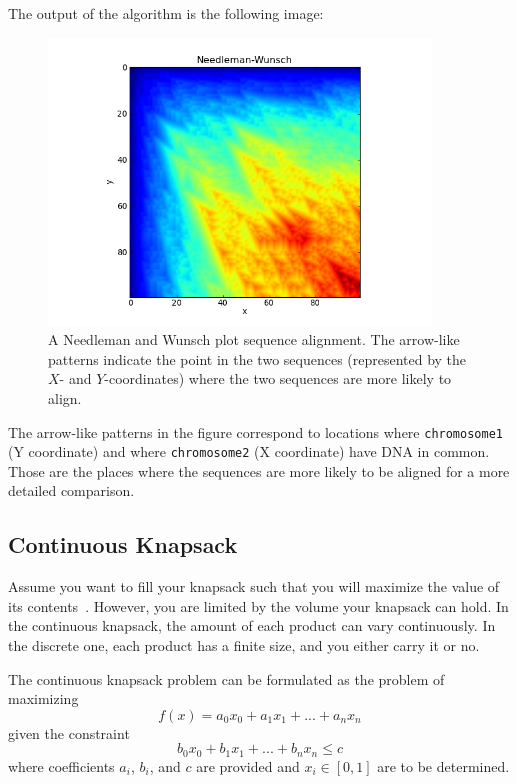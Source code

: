 \documentclass[justified,sixbynine]{tufte-book}
\def\ft{\small\tt}
\theoremstyle{plain}%
\theoremstyle{definition}
\theoremstyle{remark}
\begin{document}
\begin{fullwidth}
The output of the algorithm is the following image:

\begin{figure}[ht]
\centering\includegraphics[width=4in]{images/needleman.png}
\caption{A Needleman and Wunsch plot sequence alignment. The arrow-like patterns indicate the point in the two sequences (represented by the $X$- and $Y$-coordinates) where the two sequences are more likely to align.}
\end{figure}

The arrow-like patterns in the figure correspond to locations where {\ft chromosome1} (Y coordinate) and where {\ft chromosome2} (X coordinate) have DNA in common. Those are the places where the sequences are more likely to be aligned for a more detailed comparison.

\subsection{Continuous Knapsack}

Assume you want to fill your knapsack such that you will maximize the value of its contents~\cite{knapsack}.  However, you are limited by the volume your knapsack can hold. In the continuous knapsack, the amount of each product can vary continuously. In the discrete one, each product has a finite size, and you either carry it or no.

The continuous knapsack problem can be formulated as the problem of
maximizing
\begin{equation}
f(x)=a_0x_0+a_1x_1+...+a_nx_n
\end{equation}
given the constraint
\begin{equation}
b_0x_0+b_1x_1+...+b_nx_n\leq c
\end{equation}
where coefficients $a_i$, $b_i$, and $c$ are provided and $x_i\in [0,1]$ are
to be determined.


\end{fullwidth}
\end{document}
